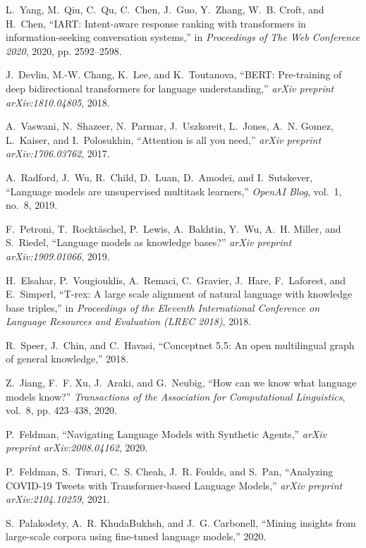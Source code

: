 \documentclass[11pt,dvipdfm]{article}
\begin{document}
\begin{thebibliography}{10}
\begin{small}
L.~Yang, M.~Qiu, C.~Qu, C.~Chen, J.~Guo, Y.~Zhang, W.~B. Croft, and H.~Chen,
  ``{IART}: Intent-aware response ranking with transformers in
  information-seeking conversation systems,'' in \emph{Proceedings of The Web
  Conference 2020}, 2020, pp. 2592--2598.

J.~Devlin, M.-W. Chang, K.~Lee, and K.~Toutanova, ``{BERT}: Pre-training of
  deep bidirectional transformers for language understanding,'' \emph{arXiv
  preprint arXiv:1810.04805}, 2018.

A.~Vaswani, N.~Shazeer, N.~Parmar, J.~Uszkoreit, L.~Jones, A.~N. Gomez,
  L.~Kaiser, and I.~Polosukhin, ``Attention is all you need,'' \emph{arXiv
  preprint arXiv:1706.03762}, 2017.

A.~Radford, J.~Wu, R.~Child, D.~Luan, D.~Amodei, and I.~Sutskever, ``Language
  models are unsupervised multitask learners,'' \emph{OpenAI Blog}, vol.~1,
  no.~8, 2019.

F.~Petroni, T.~Rockt{\"a}schel, P.~Lewis, A.~Bakhtin, Y.~Wu, A.~H. Miller, and
  S.~Riedel, ``Language models as knowledge bases?'' \emph{arXiv preprint
  arXiv:1909.01066}, 2019.

H.~Elsahar, P.~Vougiouklis, A.~Remaci, C.~Gravier, J.~Hare, F.~Laforest, and
  E.~Simperl, ``T-rex: A large scale alignment of natural language with
  knowledge base triples,'' in \emph{Proceedings of the Eleventh International
  Conference on Language Resources and Evaluation (LREC 2018)}, 2018.

R.~Speer, J.~Chin, and C.~Havasi, ``Conceptnet 5.5: An open multilingual graph
  of general knowledge,'' 2018.

Z.~Jiang, F.~F. Xu, J.~Araki, and G.~Neubig, ``How can we know what language
  models know?'' \emph{Transactions of the Association for Computational
  Linguistics}, vol.~8, pp. 423--438, 2020.

P.~Feldman, ``{Navigating Language Models with Synthetic Agents},'' \emph{arXiv
  preprint arXiv:2008.04162}, 2020.

P.~Feldman, S.~Tiwari, C.~S. Cheah, J.~R. Foulds, and S.~Pan, ``{Analyzing
  COVID-19 Tweets with Transformer-based Language Models},'' \emph{arXiv
  preprint arXiv:2104.10259}, 2021.

S.~Palakodety, A.~R. KhudaBukhsh, and J.~G. Carbonell, ``Mining insights from
  large-scale corpora using fine-tuned language models,'' 2020.


\end{small}
\end{thebibliography}
\end{document}
